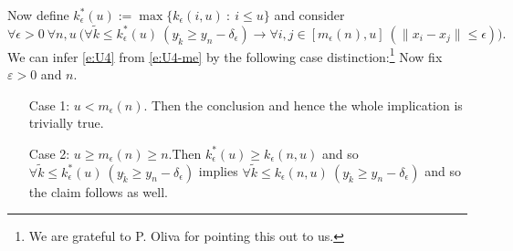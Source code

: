 Now define $k^*_\epsilon(u):=\max\{k_\epsilon(i,u)\ :\ i\leq u\}$ and consider
\[
\forall \epsilon>0\ \forall n,u\ \Big( \forall \tilde k\le k^*_\epsilon(u)\ (y_{\tilde k}\geq y_n-\delta_\epsilon)\rightarrow 
 \forall i,j\in[m_\epsilon(n),u]\ (\|x_i-x_j\|\leq \epsilon) \Big).
\tag{$**$}\label{e:U4}\]
We can infer \eqref{e:U4} from \eqref{e:U4-me} by the following case 
distinction:\footnote{We are grateful to P. Oliva for pointing this out to us.}
Now fix $\varepsilon >0$ and $n.$ 
\begin{itemize}
\item[Case]  1: $u<m_\epsilon(n)$. Then the conclusion and hence the whole implication is trivially true.
\item[Case]  2: $u\geq m_\epsilon(n) \geq n$.Then $k^*_\epsilon(u)\geq 
k_\epsilon(n,u)$ and so $\forall \tilde k\le k^*_\epsilon(u)\ 
(y_{\tilde k}\geq y_n-\delta_\epsilon)$ implies $\forall \tilde k\le 
k_\epsilon(n,u)\ (y_{\tilde k}\geq y_n-\delta_\epsilon)$ and so the claim 
follows as well.
\end{itemize}

